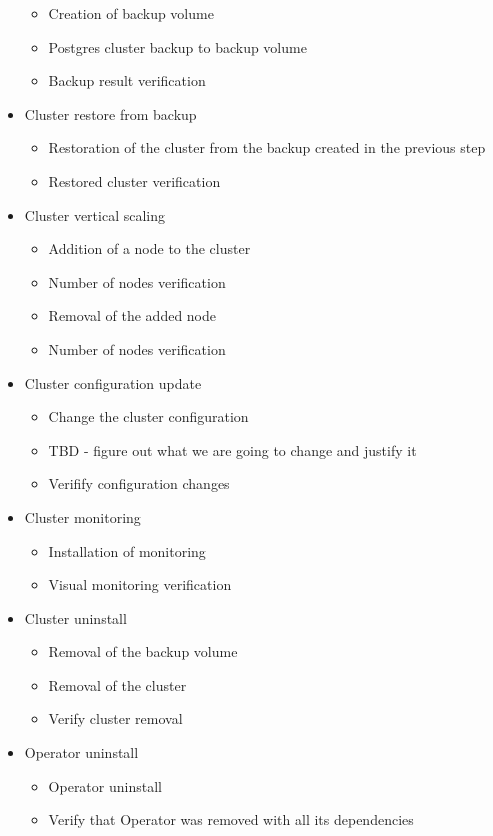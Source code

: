 \begin{itemize}
        \begin{itemize}
          \item Creation of backup volume
          \item Postgres cluster backup to backup volume
          \item Backup result verification
        \end{itemize}
  \item Cluster restore from backup
        \begin{itemize}
          \item Restoration of the cluster from the backup created in the previous step
          \item Restored cluster verification
        \end{itemize}
  \item Cluster vertical scaling
        \begin{itemize}
          \item Addition of a node to the cluster
          \item Number of nodes verification
          \item Removal of the added node
          \item Number of nodes verification
        \end{itemize}
  \item Cluster configuration update
        \begin{itemize}
          \item Change the cluster configuration
          \item TBD - figure out what we are going to change and justify it
          \item Verifify configuration changes
        \end{itemize}
  \item Cluster monitoring
        \begin{itemize}
          \item Installation of monitoring
          \item Visual monitoring verification
        \end{itemize}
  \item Cluster uninstall
        \begin{itemize}
          \item Removal of the backup volume
          \item Removal of the cluster
          \item Verify cluster removal
        \end{itemize}
  \item Operator uninstall
        \begin{itemize}
          \item Operator uninstall
          \item Verify that Operator was removed with all its dependencies
        \end{itemize}
\end{itemize}


